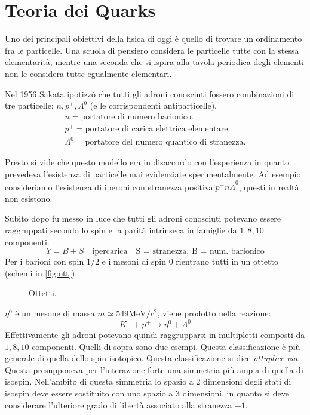 \section{Teoria dei Quarks}
 Uno dei principali obiettivi della fisica di oggi è 
quello
di trovare un ordinamento fra le particelle.
Una scuola di pensiero considera le particelle tutte con la stessa 
elementarità,
mentre una seconda che si ispira alla tavola periodica degli elementi non le
considera tutte egualmente elementari.

Nel 1956 Sakata ipotizzò che tutti gli adroni conosciuti fossero combinazioni 
di
tre particelle: $n,p^+,\Lambda^0$ (e le corrispondenti antiparticelle).
\begin{gather}
n=\text{portatore di numero barionico.}\\
p^+=\text{portatore di carica elettrica elementare.}\\
\Lambda^0=\text{portatore del numero quantico di stranezza}.
\end{gather}

Presto si vide che questo modello era in disaccordo con l'esperienza in quanto
prevedeva l'esistenza di particelle mai evidenziate sperimentalmente.
Ad esempio consideriamo l'esistenza di iperoni con stranezza
positiva:$p^+n\bar{\Lambda}^0$, questi in realtà non esistono.

Subito dopo fu messo in luce che tutti gli adroni conosciuti potevano essere
raggruppati secondo lo spin e la parità intrinseca in famiglie da $1,8,10$
componenti.
\[
Y=B+S\quad\text{ipercarica}\quad\text{S = stranezza, B = num. barionico}
\]
Per i barioni con spin $1/2$ e i mesoni di spin $0$ rientrano tutti in un
ottetto (schemi in \autoref{fig:ott}).
\begin{figure}[!h]
  \caption{Ottetti.}
  \label{fig:ott}
\end{figure}

$\eta^0$ è un mesone di massa $m\simeq549\si{\mega\electronvolt}/c^2$, viene
prodotto nella reazione:
\[
K^-+p^+\rightarrow \eta^0+\Lambda^0
\]
Effettivamente gli adroni potevano quindi raggrupparsi in multipletti composti
da $1,8,10$ componenti. Quelli di sopra sono due esempi.
Questa classificazione è più generale di quella dello spin isotopico. Questa
classificazione si dice \textit{ottuplice via}.
Questa presupponeva per l'interazione forte una simmetria più ampia di quella 
di
isospin. Nell'ambito di questa simmetria lo spazio a 2 dimensioni degli stati di
isospin deve essere sostituito con uno spazio a 3 dimensioni, in quanto si deve
considerare l'ulteriore grado di libertà associato alla stranezza $-1$.

